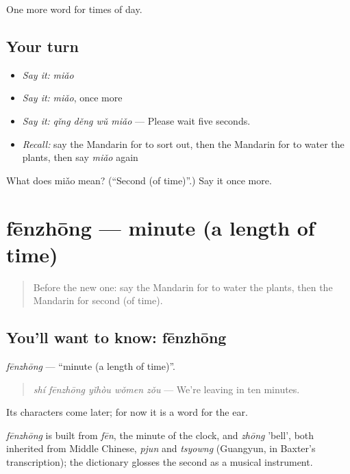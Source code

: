 \begin{grammarlens}[title={What you've built}]
One more word for times of day.
\end{grammarlens}

\subsection*{Your turn}
\begin{itemize}
\raggedright
  \item \emph{Say it:} \emph{miǎo}
  \item \emph{Say it:} \emph{miǎo}, once more
  \item \emph{Say it:} \emph{qǐng děng wǔ miǎo} — Please wait five seconds.
  \item \emph{Recall:} say the Mandarin for to sort out, then the Mandarin for to water the plants, then say \emph{miǎo} again
\end{itemize}

\begin{tcolorbox}[breakable,colback=teal!4,colframe=teal!35!black,title={Before you move on}]
What does miǎo mean? (\textquotedblleft{}Second (of time)\textquotedblright{}.) Say it once more.
\end{tcolorbox}
\section[fēnzhōng]{fēnzhōng — minute (a length of time)}

\label{lesson:ZH-C143-fenzhong}



\begin{quote}
Before the new one: say the Mandarin for to water the plants, then the Mandarin for second (of time).
\end{quote}

\subsection*{You'll want to know: fēnzhōng}
\emph{fēnzhōng} — \textquotedblleft{}minute (a length of time)\textquotedblright{}.

\begin{quote}
\emph{shí fēnzhōng yǐhòu wǒmen zǒu} — We're leaving in ten minutes.
\end{quote}

Its characters come later; for now it is a word for the ear.

\begin{cousinweb}
\emph{fēnzhōng} is built from \emph{fēn}, the minute of the clock, and \emph{zhōng} 'bell', both inherited from Middle Chinese, \emph{pjun} and \emph{tsyowng} (Guangyun, in Baxter's transcription); the dictionary glosses the second as a musical instrument.
\end{cousinweb}

